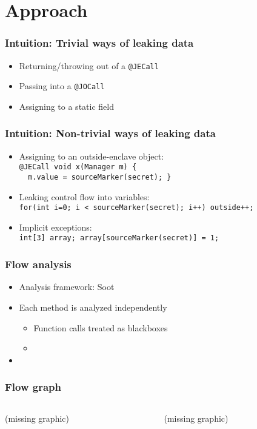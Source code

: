 \documentclass{beamer}
\newcommand{\code}[1]{\colorbox{code}{\texttt{\footnotesize #1}}}
\begin{document}
\section{Approach}
\begin{frame}
  \frametitle{Intuition: Trivial ways of leaking data}
  \begin{itemize}
    \item Returning/throwing out of a \code{@JECall}
    \item Passing into a \code{@JOCall}
    \item Assigning to a static field
  \end{itemize}
\end{frame}

\begin{frame}
  \frametitle{Intuition: Non-trivial ways of leaking data}
  \begin{itemize}
    \item Assigning to an outside-enclave object:\\
      \code{@JECall void x(Manager m) \{} \\
      \code{~~m.value = sourceMarker(secret); \} } \\
    \item Leaking control flow into variables:\\
      \code{for(int i=0; i < sourceMarker(secret); i++) outside++;}
    \item Implicit exceptions:\\
      \code{int[3] array; array[sourceMarker(secret)] = 1;}
  \end{itemize}
\end{frame}

\begin{frame}
  \frametitle{Flow analysis}
  \begin{itemize}
    \item Analysis framework: Soot \cite{sootsurvivor}
    \item Each method is analyzed independently
      \begin{itemize}
        \item Function calls treated as blackboxes
        \item 
      \end{itemize}
    \item 
  \end{itemize}
\end{frame}

\begin{frame}
  \frametitle{Flow graph}
  \begin{columns}
    \begin{column}{0.5\textwidth}
      (missing graphic)
    \end{column}
    \begin{column}{0.5\textwidth}
      (missing graphic)
    \end{column}
  \end{columns}
\end{frame}
\end{document}
